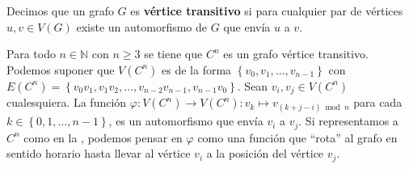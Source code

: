\begin{Def}
   Decimos que un grafo $G$ es \textbf{vértice transitivo} si para cualquier par de vértices $u,v\in V(G)$ existe un automorfismo de $G$ que envía $u$ a $v$.    
\end{Def}
\begin{Ejm}
   Para todo $n\in\mathbb{N}$ con $n\ge 3$ se tiene que $C^n$ es un grafo vértice transitivo. Podemos suponer que $V(C^n)$ es de la forma $\left\lbrace v_0,v_1, \dots, v_{n-1}\right\rbrace$ con $E(C^n)=\left\lbrace v_0v_1, v_1v_2, \dots ,v_{n-2}v_{n-1}, v_{n-1}v_0\right\rbrace$. Sean $v_i,v_j\in V(C^n)$ cualesquiera. La función $\varphi :V(C^n)\to V(C^n):v_k\mapsto v_{(k+j-i)\bmod n}$ para cada $k\in\left\lbrace 0,1,\dots ,n-1\right\rbrace$, es un automorfismo que envía $v_i$ a $v_j$. Si representamos a $C^n$ como en la , podemos pensar en $\varphi$ como una función que ``rota'' al grafo en sentido horario hasta llevar al vértice $v_i$ a la posición del vértice $v_j$.\clearpage
   
\end{Ejm}

